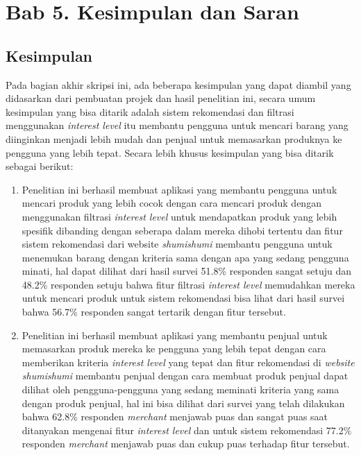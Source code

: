 \documentclass[a4paper]{article}
\newcommand{\bab}[1]{%
    \addtocounter{section}{1}%
    \setcounter{subsection}{0}
    \setcounter{subsubsection}{0}
    \setcounter{figure}{0}
    \setcounter{table}{0}
    \section*{#1}%
    \addcontentsline{toc}{section}{\protect\numberline{}#1}%
}
\newcommand{\subbab}[1]{%
    \subsection{#1}%
    \setcounter{figure}{0}
    \setcounter{table}{0}
}
\begin{document}
\bab{Bab 5. Kesimpulan dan Saran}
\subbab{Kesimpulan}
Pada bagian akhir skripsi ini, ada beberapa kesimpulan yang dapat diambil yang didasarkan dari pembuatan projek dan hasil penelitian ini, secara umum kesimpulan yang bisa ditarik adalah sistem rekomendasi dan filtrasi menggunakan \textit{interest level} itu membantu pengguna untuk mencari barang yang diinginkan menjadi lebih mudah dan penjual untuk memasarkan produknya ke pengguna yang lebih tepat. Secara lebih khusus kesimpulan yang bisa ditarik sebagai berikut:
\begin{enumerate}
    \item Penelitian ini berhasil membuat aplikasi yang membantu pengguna untuk mencari produk yang lebih cocok dengan cara mencari produk dengan menggunakan filtrasi \textit{interest level} untuk mendapatkan produk yang lebih spesifik dibanding dengan seberapa dalam mereka dihobi tertentu dan fitur sistem rekomendasi dari website \textit{shumishumi} membantu pengguna untuk menemukan barang dengan kriteria sama dengan apa yang sedang pengguna minati, hal dapat dilihat dari hasil  survei 51.8\% responden sangat setuju dan 48.2\% responden setuju bahwa fitur filtrasi \textit{interest level} memudahkan mereka untuk mencari produk untuk sistem rekomendasi bisa lihat dari hasil survei bahwa 56.7\% responden sangat tertarik dengan fitur tersebut.
    \item Penelitian ini berhasil membuat aplikasi yang membantu penjual untuk memasarkan produk mereka ke pengguna yang lebih tepat dengan cara memberikan kriteria \textit{interest level} yang tepat dan fitur rekomendasi di \textit{website shumishumi} membantu penjual dengan cara membuat produk penjual dapat dilihat oleh pengguna-pengguna yang sedang meminati kriteria yang sama dengan produk penjual, hal ini bisa dilihat dari survei yang telah dilakukan bahwa 62.8\% responden \textit{merchant} menjawab puas dan sangat puas saat ditanyakan mengenai fitur \textit{interest level} dan untuk sistem rekomendasi 77.2\% responden \textit{merchant} menjawab puas dan cukup puas terhadap fitur tersebut.
\end{enumerate}
\end{document}
